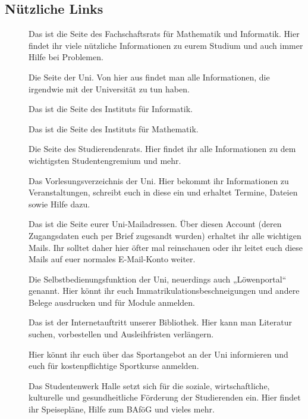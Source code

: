 \subsection{Nützliche Links}
\begin{description}
\item[]
    Das ist die Seite des Fachschaftsrats für Mathematik und Informatik.
    Hier findet ihr viele nützliche Informationen zu eurem Studium und auch immer Hilfe bei Problemen.
\item[]
    Die Seite der Uni. Von hier aus findet man alle Informationen, die irgendwie mit der Universität zu tun haben.
\item[]
    Das ist die Seite des Instituts für Informatik.
\item[]
    Das ist die Seite des Instituts für Mathematik.
\item[]
    Die Seite des Studierendenrats. Hier findet ihr alle Informationen zu dem wichtigsten Studentengremium und mehr.
\item[]
    Das Vorlesungsverzeichnis der Uni.
    Hier bekommt ihr Informationen zu Veranstaltungen, schreibt euch in diese ein und erhaltet Termine, Dateien sowie Hilfe dazu.
\item[]
    Das ist die Seite eurer Uni-Mailadressen.
    Über diesen Account (deren Zugangsdaten euch per Brief zugesandt wurden) erhaltet ihr alle wichtigen Mails.
    Ihr solltet daher hier öfter mal reinschauen oder ihr leitet euch diese Mails auf euer normales E-Mail-Konto weiter.
\item[]
    Die Selbstbedienungsfunktion der Uni, neuerdings auch „Löwenportal“ genannt.
    Hier könnt ihr euch Immatrikulationsbeschneigungen und andere Belege ausdrucken und für Module anmelden.
\item[]
    Das ist der Internetauftritt unserer Bibliothek. Hier kann man Literatur suchen, vorbestellen und Ausleihfristen verlängern.
\item[]
    Hier könnt ihr euch über das Sportangebot an der Uni informieren und euch für kostenpflichtige Sportkurse anmelden.
\item[]
    Das Studentenwerk Halle setzt sich für die soziale, wirtschaftliche, kulturelle und gesundheitliche Förderung der Studierenden ein.
    Hier findet ihr Speisepläne, Hilfe zum BAföG und vieles mehr.
\end{description}

